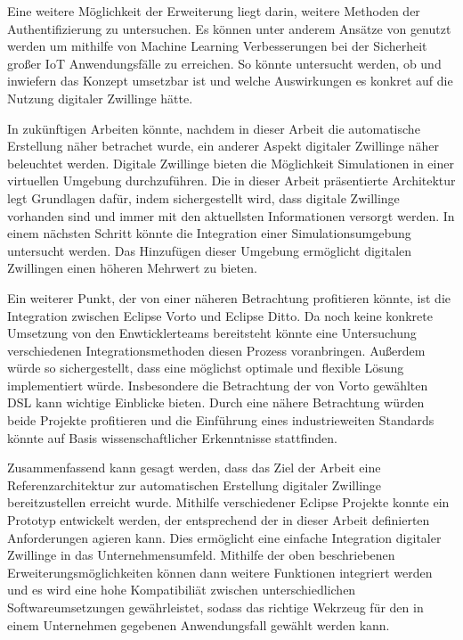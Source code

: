 \documentclass[
	12pt,
	BCOR=5mm,
	DIV=12,
	headinclude=on,
	footinclude=off,
	parskip=half,
	bibliography=totoc,
	listof=entryprefix,
	toc=listof,
	numbers=noenddot,
	plainfootsepline
]{scrreprt}
\begin{document}
Eine weitere Möglichkeit der Erweiterung liegt darin, weitere Methoden der Authentifizierung zu untersuchen. Es können unter anderem Ansätze von \citeauthor{fang2020fast} genutzt werden um mithilfe von Machine Learning Verbesserungen bei der Sicherheit großer IoT Anwendungsfälle zu erreichen. \autocite{fang2020fast} So könnte untersucht werden, ob und inwiefern das Konzept umsetzbar ist und welche Auswirkungen es konkret auf die Nutzung digitaler Zwillinge hätte. 

In zukünftigen Arbeiten könnte, nachdem in dieser Arbeit die automatische Erstellung näher betrachet wurde, ein anderer Aspekt digitaler Zwillinge näher beleuchtet werden. Digitale Zwillinge bieten die Möglichkeit Simulationen in einer virtuellen Umgebung durchzuführen. Die in dieser Arbeit präsentierte Architektur legt Grundlagen dafür, indem sichergestellt wird, dass digitale Zwillinge vorhanden sind und immer mit den aktuellsten Informationen versorgt werden. In einem nächsten Schritt könnte die Integration einer Simulationsumgebung untersucht werden. Das Hinzufügen dieser Umgebung ermöglicht digitalen Zwillingen einen höheren Mehrwert zu bieten.

Ein weiterer Punkt, der von einer näheren Betrachtung profitieren könnte, ist die Integration zwischen Eclipse Vorto und Eclipse Ditto. Da noch keine konkrete Umsetzung von den Enwticklerteams bereitsteht könnte eine Untersuchung verschiedenen Integrationsmethoden diesen Prozess voranbringen. Außerdem würde so sichergestellt, dass eine möglichst optimale und flexible Lösung implementiert würde. Insbesondere die Betrachtung der von Vorto gewählten \ac{DSL} kann wichtige Einblicke bieten. Durch eine nähere Betrachtung würden beide Projekte profitieren und die Einführung eines industrieweiten Standards könnte auf Basis wissenschaftlicher Erkenntnisse stattfinden.

Zusammenfassend kann gesagt werden, dass das Ziel der Arbeit eine Referenzarchitektur zur automatischen Erstellung digitaler Zwillinge bereitzustellen erreicht wurde. Mithilfe verschiedener Eclipse Projekte konnte ein Prototyp entwickelt werden, der entsprechend der in dieser Arbeit definierten Anforderungen agieren kann. Dies ermöglicht eine einfache Integration digitaler Zwillinge in das Unternehmensumfeld. Mithilfe der oben beschriebenen Erweiterungsmöglichkeiten können dann weitere Funktionen integriert werden und es wird eine hohe Kompatibiliät zwischen unterschiedlichen Softwareumsetzungen gewährleistet, sodass das richtige Wekrzeug für den in einem Unternehmen gegebenen Anwendungsfall gewählt werden kann.
\clearpage
\ihead{}
\printbibliography[title=Literaturverzeichnis]
\cleardoublepage

\end{document}

